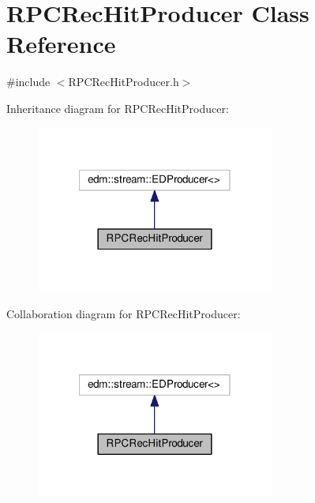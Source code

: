 \hypertarget{classRPCRecHitProducer}{\section{R\-P\-C\-Rec\-Hit\-Producer Class Reference}
\label{classRPCRecHitProducer}
}


{\ttfamily \#include $<$R\-P\-C\-Rec\-Hit\-Producer.\-h$>$}



Inheritance diagram for R\-P\-C\-Rec\-Hit\-Producer\-:
\nopagebreak
\begin{figure}[H]
\begin{center}
\leavevmode
\includegraphics[width=222pt]{classRPCRecHitProducer__inherit__graph}
\end{center}
\end{figure}


Collaboration diagram for R\-P\-C\-Rec\-Hit\-Producer\-:
\nopagebreak
\begin{figure}[H]
\begin{center}
\leavevmode
\includegraphics[width=222pt]{classRPCRecHitProducer__coll__graph}
\end{center}
\end{figure}
